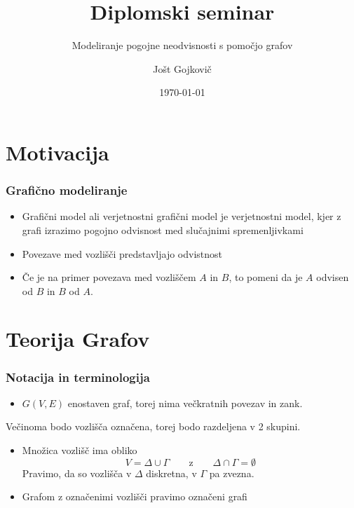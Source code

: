 \documentclass{beamer}
\title{Diplomski seminar}
\subtitle{Modeliranje pogojne neodvisnosti s pomočjo grafov}
\author{Jošt Gojkovič}
\institute[FMF] {Fakulteta za matematiko in fiziko}
\date{\today}
\begin{document}
\begin{frame}
    \titlepage         %
  \end{frame}
  

\section{Motivacija}

\begin{frame}
    \frametitle{Grafično modeliranje}
    \begin{itemize}
        \item Grafični model ali verjetnostni grafični model je verjetnostni model, kjer z 
        grafi izrazimo pogojno odvisnost med slučajnimi spremenljivkami
        \item Povezave med vozlišči predstavljajo odvistnost
        \item Če je na primer povezava med vozliščem $A$ in $B$, to pomeni da je $A$ odvisen od $B$
        in $B$ od $A$. 
    \end{itemize}
   
\end{frame}

\section{Teorija Grafov}

\begin{frame}
    \frametitle{Notacija in terminologija}
    \begin{itemize}
        \item $G(V,E)$ enostaven graf, torej nima večkratnih povezav in zank. 
    \end{itemize}
    Večinoma bodo vozlišča označena, torej bodo razdeljena v 2 skupini.
    \begin{itemize}
        \item Množica vozlišč ima obliko 
        $$ V = \Delta \cup \Gamma \qquad \text{z} \qquad \Delta \cap  \Gamma = \emptyset  $$ 
        Pravimo, da so vozlišča v $\Delta$ diskretna, v $\Gamma$ pa zvezna.  
        \item Grafom z označenimi vozlišči pravimo označeni grafi 
    \end{itemize}
\end{frame}
\end{document}
